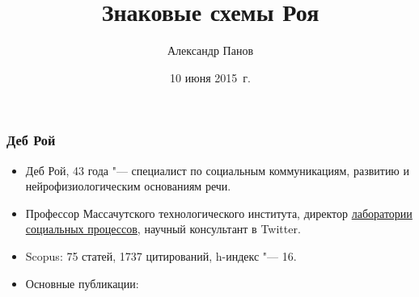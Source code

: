\documentclass[default]{beamer}
\begin{document}
	
	\title[Semiotic schemas]{Знаковые схемы Роя}
	\author[Панов]{Александр Панов}
	\date{10 июня 2015~г.} 
	
	\begin{frame}
		\titlepage
	\end{frame}
	
	\begin{frame}
		\frametitle{Деб Рой}
		
		\begin{itemize}
			\item Деб Рой, 43 года "--- специалист по социальным коммуникациям, развитию и нейрофизиологическим основаниям речи.
			\item Профессор Массачутского технологического института, директор \href{http://socialmachines.media.mit.edu/}{лаборатории социальных процессов}, научный консультант в Twitter.
			\item Scopus: 75 статей, 1737 цитирований, h-индекс "--- 16.
			\item Основные публикации:

			{
				\scriptsize
				\nocite{*}
				
			}
		\end{itemize}
	\end{frame}
	
\end{document}

